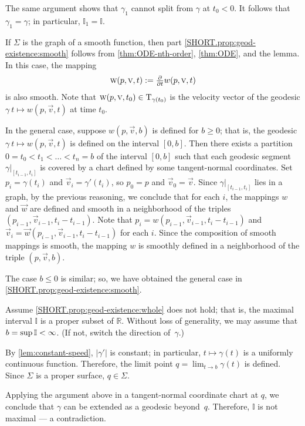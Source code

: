 The same argument shows that $\gamma_1$ cannot split from $\gamma$ at $t_0<0$.
It follows that $\gamma_1=\gamma$;
in particular, $\mathbb{I}_1=\mathbb{I}$.

If $\Sigma$ is the graph of a smooth function, then part \ref{SHORT.prop:geod-existence:smooth} follows from \ref{thm:ODE-nth-order}, \ref{thm:ODE}, and the lemma.
In this case, the mapping
\[\text{\sc{w}}(p,\text{\sc{v}},t)\mathrel{:=}\tfrac{\partial}{\partial t}w(p,\text{\sc{v}},t)\]
is also smooth.
Note that $\text{\sc{w}}(p,\text{\sc{v}},t_0) \in \mathrm{T}_{\gamma(t_0)}$ is the velocity vector of the geodesic $\gamma\:t\mapsto w(p,\vec v,t)$ at time $t_0$.

In the general case, suppose $w(p,{\vec v},b)$ is defined for $b\ge0$; that is, the geodesic $\gamma\:t\mapsto w(p,{\vec v},t)$ is defined on the interval $[0,b]$.
Then there exists a partition $0=t_0<t_1<\dots<t_n=b$ of the interval $[0,b]$ such that each geodesic segment $\gamma|_{[t_{i-1},t_i]}$ is covered by a chart defined by some tangent-normal coordinates.
Set $p_i=\gamma(t_i)$ and $\vec v_i=\gamma'(t_i)$, so $p_0=p$ and $\vec v_0=\vec v$.
Since $\gamma|_{[t_{i-1},t_i]}$ lies in a graph, by the previous reasoning, we conclude that for each $i$, the mappings
$w$ and $\vec w$ are defined and smooth in a neighborhood of the triples $(p_{i-1},\vec v_{i-1}, t_i-t_{i-1})$.
Note that $p_i=w(p_{i-1},\vec v_{i-1},t_i-t_{i-1})$ and $\vec v_i=\vec w(p_{i-1},\vec v_{i-1},t_i-t_{i-1})$ for each $i$.
Since the composition of smooth mappings is smooth, the mapping $w$ is smoothly defined in a neighborhood of the triple $(p,\vec v, b)$.

The case $b\le 0$ is similar; so, we have obtained the general case in \ref{SHORT.prop:geod-existence:smooth}.


Assume \ref{SHORT.prop:geod-existence:whole} does not hold;
that is, the maximal interval $\mathbb{I}$ is a proper subset of $\mathbb{R}$.
Without loss of generality, we may assume that $b=\sup\mathbb{I}\z<\infty$.
(If not, switch the direction of~$\gamma$.)

By \ref{lem:constant-speed}, $|\gamma'|$ is constant; in particular, $t\mapsto \gamma(t)$ is a uniformly continuous function.
Therefore, the limit point
$q=\lim_{t\to b}\gamma(t)$
is defined.
Since $\Sigma$ is a proper surface, $q\in \Sigma$. 

Applying the argument above in a tangent-normal coordinate chart at $q$, we conclude that $\gamma$ can be extended as a geodesic beyond~$q$.
Therefore, $\mathbb{I}$ is not maximal --- a contradiction.
\qeds

